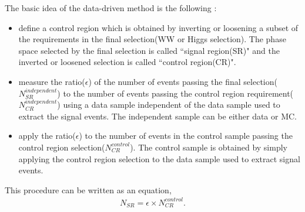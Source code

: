 The basic idea of the data-driven method is the following : 
\begin{itemize}
\item define a control region which is obtained by inverting or loosening 
      a subset of the requirements in the final selection(WW or Higgs selection).
      The phase space selected by the final selection is called ``signal region(SR)" 
      and the inverted or loosened selection is called ``control region(CR)". 
\item measure the ratio($\epsilon$) of the number of events passing the 
      final selection($N_{SR}^{independent}$) to the number of events 
      passing the control region requirement($N_{CR}^{independent}$) 
      using a data sample independent of the data sample 
      used to extract the signal events. 
      The independent sample can be either data or MC. 
\item apply the ratio($\epsilon$) to the number of events in the control sample 
      passing the control region selection($N_{CR}^{control}$). The control sample 
      is obtained by simply applying the control region selection 
      to the data sample used to extract signal events. 
\end{itemize}
This procedure can be written as an equation, 
\begin{eqnarray} 
N_{SR} = \epsilon \times N_{CR}^{control}.
\end{eqnarray} 


